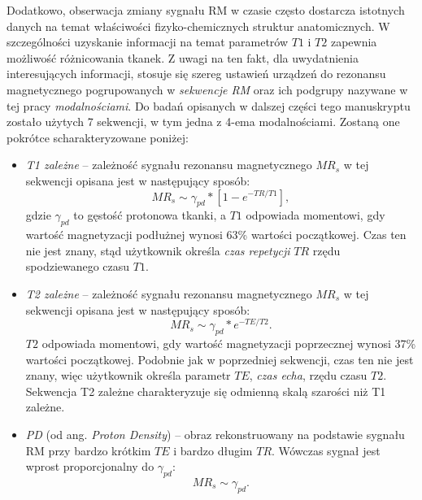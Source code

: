 Dodatkowo, obserwacja zmiany sygnału RM w czasie często dostarcza istotnych danych na temat właściwości fizyko-chemicznych struktur anatomicznych. W szczególności uzyskanie informacji na temat parametrów $T1$ i $T2$ zapewnia możliwość różnicowania tkanek. Z uwagi na ten fakt, dla uwydatnienia interesujących informacji, stosuje się szereg ustawień urządzeń do rezonansu magnetycznego pogrupowanych w \textit{sekwencje RM} oraz ich podgrupy nazywane w tej pracy \textit{modalnościami}. \linebreak Do badań opisanych w dalszej części tego manuskryptu zostało użytych 7 sekwencji, w tym jedna z 4-ema modalnościami. Zostaną one pokrótce scharakteryzowane poniżej:
\begin{itemize}[noitemsep,nolistsep]
	\item \textit{T1 zależne} -- zależność sygnału rezonansu magnetycznego $MR_s$ w tej sekwencji opisana jest w następujący sposób: 
	\begin{equation}
		MR_s \sim \gamma_{pd} \ast [1-e^{-TR/T1}],
	\end{equation}
	gdzie $\gamma_{pd}$ to gęstość protonowa tkanki, a $T1$ odpowiada momentowi, gdy wartość magnetyzacji podłużnej wynosi 63\% wartości początkowej. Czas ten nie jest znany, stąd użytkownik określa \textit{czas repetycji} $TR$ rzędu spodziewanego czasu $T1$.
	\item \textit{T2 zależne} -- zależność sygnału rezonansu magnetycznego $MR_s$ w tej sekwencji opisana jest w następujący sposób: 
	\begin{equation}
	\label{T2ecquation}
	MR_s \sim \gamma_{pd} \ast e^{-TE/T2}.
	\end{equation}
	$T2$ odpowiada momentowi, gdy wartość magnetyzacji poprzecznej wynosi 37\% wartości początkowej. Podobnie jak w poprzedniej sekwencji, czas ten nie jest znany, więc użytkownik określa parametr $TE$, \textit{czas echa}, rzędu czasu $T2$. Sekwencja T2 zależne charakteryzuje się odmienną skalą szarości niż T1 zależne.
	\item \textit{PD} (od ang. \textit{Proton Density}) -- obraz rekonstruowany na podstawie sygnału RM przy bardzo krótkim $TE$ i bardzo długim $TR$. Wówczas sygnał jest wprost proporcjonalny do $\gamma_{pd}$:
	\begin{equation}
	MR_s \sim \gamma_{pd}.
	\end{equation}

\end{itemize}
